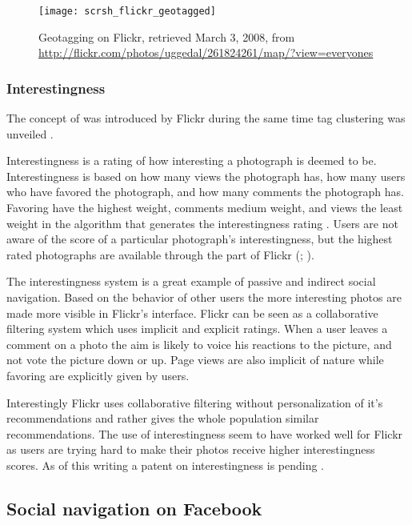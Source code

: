 \begin{figure}
  \texttt{[image: scrsh\_flickr\_geotagged]}
  \caption[Flickr Geotagging]{%
     Geotagging on Flickr,
     retrieved March 3, 2008, from
     \url{http://flickr.com/photos/uggedal/261824261/map/?view=everyones}}
  \label{figure:scrsh.flickr.geotagged}
\end{figure}

\subsubsection{Interestingness}
\label{section:analysis.flickr.interestingness}

The concept of  was introduced by Flickr during
the same time tag clustering was unveiled \citep{butterfield05}.

Interestingness is a rating of how interesting a photograph is deemed to be.
Interestingness is based on
how many views the photograph has, how many users who have favored the
photograph, and how many comments the photograph has. Favoring have the
highest weight, comments medium weight, and views the least weight
in the algorithm that generates the interestingness rating \citep{dean08}.
Users are not aware of the score of a particular photograph's interestingness,
but the highest rated photographs are available through the  part of
Flickr
(;
).

The interestingness system is a great example of passive and indirect social
navigation. Based on the behavior of other users the more interesting photos
are made more visible in Flickr's interface. Flickr can be seen as a
collaborative filtering system which uses implicit and explicit ratings.
When a user leaves a comment on a photo the aim is likely to voice his
reactions to the picture, and not vote the picture down or up. Page views
are also implicit of nature while favoring are explicitly given by users.

Interestingly Flickr uses
collaborative filtering without personalization of it's recommendations and
rather gives the whole population similar recommendations.
The use of interestingness seem
to have worked well for Flickr as users are trying hard to make their photos
receive higher interestingness scores.
As of this writing a patent on interestingness is pending
\citep{butterfield06b}.

\subsection{Social navigation on Facebook}
\label{section:analysis.facebook}

